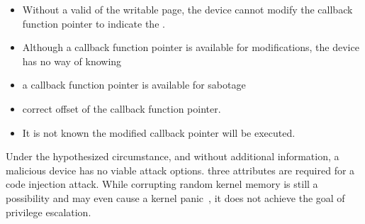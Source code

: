 \begin{itemize}
    \item Without a valid \kva{} of the writable page, the device cannot modify the callback function pointer to indicate the \mabaf.
    \item Although a callback function pointer is available for modifications, the device has no way of knowing \DIFdelbegin \DIFdel{: 
    }%
\item[\DIFdel{(a)}]%
\DIFdelend \DIFaddbegin {}\DIFaddend a callback function pointer is available for sabotage \DIFdelbegin {}%
\item[\DIFdel{(b)}]%
\DIFdelend \DIFaddbegin {}\DIFaddend correct offset of the callback function pointer.
    \DIFdelbegin %
\DIFdelend \item It is not known \DIFdelbegin {}\DIFdelend \DIFaddbegin {}\DIFaddend the modified callback pointer will be executed.
\end{itemize}

Under the hypothesized circumstance, and without additional information, a malicious device has no viable attack options.
\DIFdelbegin {}\DIFdelend \DIFaddbegin {}\DIFaddend three attributes are required for a code injection attack.
While corrupting \DIFaddbegin {}\DIFaddend random kernel memory is still a possibility and may even cause a kernel panic~\cite{MMT16}, it does not achieve the goal of privilege escalation.
